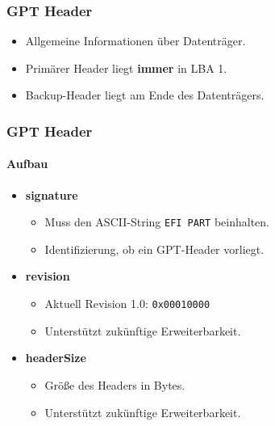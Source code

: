 \begin{frame}
    \frametitle{GPT Header}

    \begin{itemize}
        \item Allgemeine Informationen über Datenträger.
        \item Primärer Header liegt \textbf{immer} in LBA 1.
        \item Backup-Header liegt am Ende des Datenträgers.
    \end{itemize}
\end{frame}

\begin{frame}
    \frametitle{GPT Header}
    \framesubtitle{Aufbau}

    \begin{itemize}
        \item \textbf{signature}
        \begin{itemize}
            \item Muss den ASCII-String \texttt{EFI PART} beinhalten.
            \item Identifizierung, ob ein GPT-Header vorliegt.
        \end{itemize}

        \pause
        \item \textbf{revision}
        \begin{itemize}
            \item Aktuell Revision 1.0: \texttt{0x00010000}
            \item Unterstützt zukünftige Erweiterbarkeit.
        \end{itemize}

        \pause
        \item \textbf{headerSize}
        \begin{itemize}
            \item Größe des Headers in Bytes.
            \item Unterstützt zukünftige Erweiterbarkeit.
        \end{itemize}
    \end{itemize}
\end{frame}

